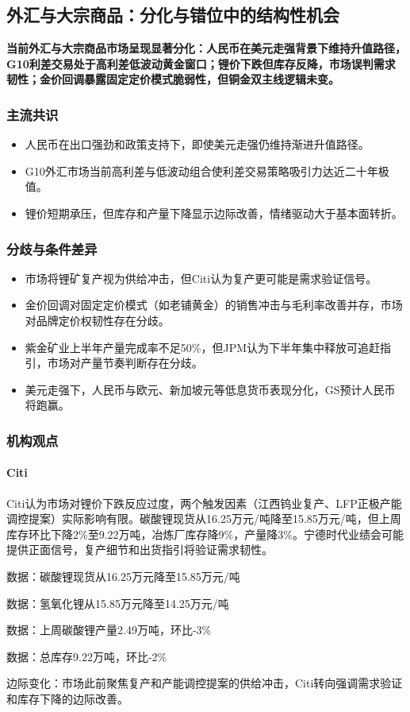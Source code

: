 \documentclass[11pt]{ctexart}
\begin{document}
\subsection{外汇与大宗商品：分化与错位中的结构性机会}
\textbf{当前外汇与大宗商品市场呈现显著分化：人民币在美元走强背景下维持升值路径，G10利差交易处于高利差低波动黄金窗口；锂价下跌但库存反降，市场误判需求韧性；金价回调暴露固定定价模式脆弱性，但铜金双主线逻辑未变。}
\subsubsection*{主流共识}
\begin{itemize}
  \item 人民币在出口强劲和政策支持下，即使美元走强仍维持渐进升值路径。
  \item G10外汇市场当前高利差与低波动组合使利差交易策略吸引力达近二十年极值。
  \item 锂价短期承压，但库存和产量下降显示边际改善，情绪驱动大于基本面转折。
\end{itemize}
\subsubsection*{分歧与条件差异}
\begin{itemize}
  \item 市场将锂矿复产视为供给冲击，但Citi认为复产更可能是需求验证信号。
  \item 金价回调对固定定价模式（如老铺黄金）的销售冲击与毛利率改善并存，市场对品牌定价权韧性存在分歧。
  \item 紫金矿业上半年产量完成率不足50\%，但JPM认为下半年集中释放可追赶指引，市场对产量节奏判断存在分歧。
  \item 美元走强下，人民币与欧元、新加坡元等低息货币表现分化，GS预计人民币将跑赢。
\end{itemize}
\subsubsection*{机构观点}
\paragraph{Citi} Citi认为市场对锂价下跌反应过度，两个触发因素（江西钨业复产、LFP正极产能调控提案）实际影响有限。碳酸锂现货从16.25万元/吨降至15.85万元/吨，但上周库存环比下降2\%至9.22万吨，冶炼厂库存降9\%，产量降3\%。宁德时代业绩会可能提供正面信号，复产细节和出货指引将验证需求韧性。
{\small\color{refgray}数据：碳酸锂现货从16.25万元降至15.85万元/吨\par}
{\small\color{refgray}数据：氢氧化锂从15.85万元降至14.25万元/吨\par}
{\small\color{refgray}数据：上周碳酸锂产量2.49万吨，环比-3\%\par}
{\small\color{refgray}数据：总库存9.22万吨，环比-2\%\par}
{\small\color{refgray}边际变化：市场此前聚焦复产和产能调控提案的供给冲击，Citi转向强调需求验证和库存下降的边际改善。\par}
\end{document}
